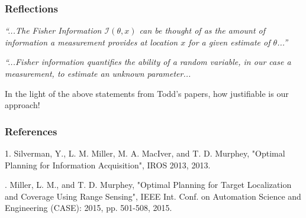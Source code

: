 \documentclass[]{article}
\begin{document}
\subsubsection*{Reflections}
\textit{``...The Fisher Information $\mathcal{I}(\theta, x)$ can be thought of as the amount of information a measurement provides at location $x$ for a given estimate of $\theta$...''}

\noindent\textit{``...Fisher information quantifies the ability of a random variable, in our case a measurement, to estimate an unknown parameter... }

In the light of the above statements from Todd's papers, how justifiable is our approach! 
\subsubsection*{References}
1. Silverman, Y., L. M. Miller, M. A. MacIver, and T. D. Murphey, "Optimal Planning for Information Acquisition", IROS 2013, 2013. 

. Miller, L. M., and T. D. Murphey, "Optimal Planning for Target Localization and Coverage Using Range Sensing", IEEE Int. Conf. on Automation Science and Engineering (CASE): 2015, pp. 501-508, 2015.  
\end{document}
